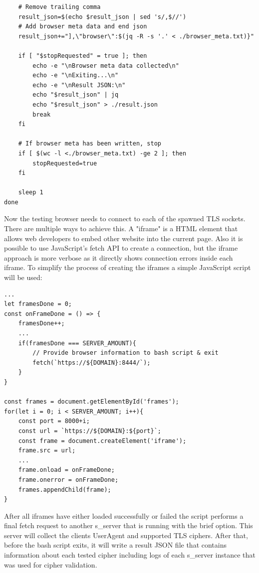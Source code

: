 \documentclass[12pt]{scrbook}
\begin{document}
\begin{verbatim}
    # Remove trailing comma
    result_json=$(echo $result_json | sed 's/,$//')
    # Add browser meta data and end json
    result_json+="],\"browser\":$(jq -R -s '.' < ./browser_meta.txt)}"

    if [ "$stopRequested" = true ]; then
        echo -e "\nBrowser meta data collected\n"
        echo -e "\nExiting...\n"
        echo -e "\nResult JSON:\n"
        echo "$result_json" | jq
        echo "$result_json" > ./result.json
        break
    fi

    # If browser meta has been written, stop
    if [ $(wc -l <./browser_meta.txt) -ge 2 ]; then
        stopRequested=true
    fi

    sleep 1
done
\end{verbatim}

\newpage

Now the testing browser needs to connect to each of the spawned TLS sockets.
There are multiple ways to achieve this.
A "iframe" is a HTML element that allows web developers to embed other website
into the current page. Also it is possible
to use JavaScript's fetch API to create a connection, but the iframe approach is
more verbose as it directly shows
connection errors inside each iframe. To simplify the process of creating the
iframes a simple JavaScript script will be used:

\begin{verbatim}
...
let framesDone = 0;
const onFrameDone = () => {
    framesDone++;
    ...
    if(framesDone === SERVER_AMOUNT){
        // Provide browser information to bash script & exit
        fetch(`https://${DOMAIN}:8444/`);
    }
}

const frames = document.getElementById('frames');
for(let i = 0; i < SERVER_AMOUNT; i++){
    const port = 8000+i;
    const url = `https://${DOMAIN}:${port}`;
    const frame = document.createElement('iframe');
    frame.src = url;
    ...
    frame.onload = onFrameDone;
    frame.onerror = onFrameDone;
    frames.appendChild(frame);
}
\end{verbatim}

After all iframes have either loaded successfully or failed the script performs
a final fetch request to another
s\_server that is running with the \-brief option. This server will collect the
clients User\-Agent and supported TLS ciphers.
After that, before the bash script exits, it will write a result JSON file that
contains information about each tested cipher including logs
of each s\_server instance that was used for cipher validation.
\end{document}
